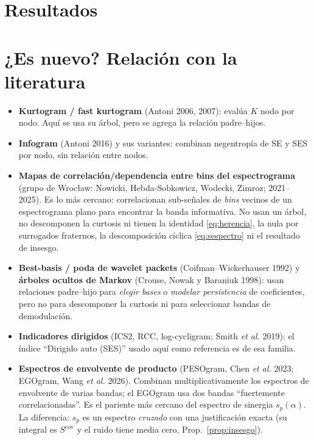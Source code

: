 \documentclass[11pt,a4paper]{article}
\theoremstyle{definition}
\theoremstyle{remark}
\begin{document}
\section{Resultados}\label{sec:resultados}


\section{¿Es nuevo? Relación con la literatura}
\begin{itemize}[leftmargin=*]
\item \textbf{Kurtogram / fast kurtogram} (Antoni 2006, 2007): evalúa $K$ nodo por nodo. Aquí se usa su árbol, pero se agrega la relación padre--hijos.
\item \textbf{Infogram} (Antoni 2016) y sus variantes: combinan negentropía de SE y SES por nodo, sin relación entre nodos.
\item \textbf{Mapas de correlación/dependencia entre bins del espectrograma} (grupo de Wrocław: Nowicki, Hebda-Sobkowicz, Wodecki, Zimroz; 2021--2025). Es lo más cercano: correlacionan sub-señales de \emph{bins} vecinos de un espectrograma plano para encontrar la banda informativa. No usan un árbol, no descomponen la curtosis ni tienen la identidad \eqref{eq:herencia}, la nula por surrogados fraternos, la descomposición cíclica \eqref{eq:sespectro} ni el resultado de insesgo.
\item \textbf{Best-basis / poda de wavelet packets} (Coifman--Wickerhauser 1992) y \textbf{árboles ocultos de Markov} (Crouse, Nowak y Baraniuk 1998): usan relaciones padre--hijo para \emph{elegir bases} o \emph{modelar persistencia} de coeficientes, pero no para descomponer la curtosis ni para seleccionar bandas de demodulación.
\item \textbf{Indicadores dirigidos} (ICS2, RCC, log-cycligram; Smith \emph{et al.} 2019): el índice ``Dirigido auto (SES)'' usado aquí como referencia es de esa familia.
\item \textbf{Espectros de envolvente de producto} (PESOgram, Chen \emph{et al.} 2023; EGOgram, Wang \emph{et al.} 2026). Combinan multiplicativamente los espectros de envolvente de varias bandas; el EGOgram usa dos bandas ``fuertemente correlacionadas''. Es el pariente más cercano del espectro de sinergia $s_p(\alpha)$. La diferencia: $s_p$ es un espectro \emph{cruzado} con una justificación exacta (su integral es $S^{\mathrm{cov}}$ y el ruido tiene media cero, Prop.~\ref{prop:insesgo}).
\end{itemize}
\end{document}
